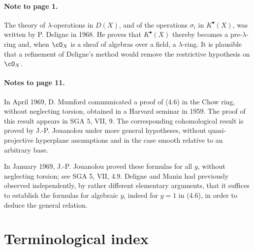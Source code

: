 \documentclass[11pt]{article}
\theoremstyle{plain}
\theoremstyle{definition}
\theoremstyle{remark}
\begin{document}
\paragraph{Note to page 1.}
The theory of $\lambda$-operations in $D(X)$, and of the operations $\sigma_i$ in $K^\bullet(X)$, was written by P. Deligne in 1968. He proves that $K^\bullet(X)$ thereby becomes a pre-$\lambda$-ring and, when $\cO_X$ is a sheaf of algebras over a field, a $\lambda$-ring. It is plausible that a refinement of Deligne's method would remove the restrictive hypothesis on $\cO_X$.

\paragraph{Notes to page 11.}
In April 1969, D. Mumford communicated a proof of (4.6) in the Chow ring, without neglecting torsion, obtained in a Harvard seminar in 1959. The proof of this result appears in SGA 5, VII, 9. The corresponding cohomological result is proved by J.-P. Jouanolou under more general hypotheses, without quasi-projective hyperplane assumptions and in the case smooth relative to an arbitrary base.

In January 1969, J.-P. Jouanolou proved these formulas for all $y$, without neglecting torsion; see SGA 5, VII, 4.9. Deligne and Manin had previously observed independently, by rather different elementary arguments, that it suffices to establish the formulas for algebraic $y$, indeed for $y=1$ in (4.6), in order to deduce the general relation.

\newpage
\section*{Terminological index}
\end{document}
